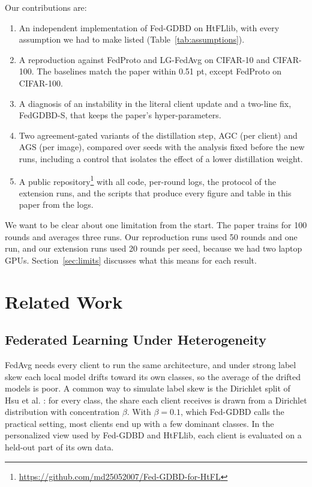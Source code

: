 \documentclass[conference]{IEEEtran}
\begin{document}
Our contributions are:
\begin{enumerate}
\item An independent implementation of Fed-GDBD on HtFLlib, with every assumption we had to make listed (Table~\ref{tab:assumptions}).
\item A reproduction against FedProto and LG-FedAvg on CIFAR-10 and CIFAR-100. The baselines match the paper within 0.51 pt, except FedProto on CIFAR-100.
\item A diagnosis of an instability in the literal client update and a two-line fix, FedGDBD-S, that keeps the paper's hyper-parameters.
\item Two agreement-gated variants of the distillation step, AGC (per client) and AGS (per image), compared over \NSeeds{} seeds with the analysis fixed before the new runs, including a control that isolates the effect of a lower distillation weight.
\item A public repository\footnote{\url{https://github.com/md25052007/Fed-GDBD-for-HtFL}} with all code, per-round logs, the protocol of the extension runs, and the scripts that produce every figure and table in this paper from the logs.
\end{enumerate}

We want to be clear about one limitation from the start. The paper trains for 100 rounds and averages three runs. Our reproduction runs used 50 rounds and one run, and our extension runs used 20 rounds per seed, because we had two laptop GPUs. Section~\ref{sec:limits} discusses what this means for each result.

\section{Related Work}
\label{sec:related}

\subsection{Federated Learning Under Heterogeneity}
FedAvg \cite{mcmahan2017fedavg} needs every client to run the same architecture, and under strong label skew each local model drifts toward its own classes, so the average of the drifted models is poor. A common way to simulate label skew is the Dirichlet split of Hsu et al. \cite{hsu2019noniid}: for every class, the share each client receives is drawn from a Dirichlet distribution with concentration $\beta$. With $\beta=0.1$, which Fed-GDBD calls the practical setting, most clients end up with a few dominant classes. In the personalized view used by Fed-GDBD and HtFLlib, each client is evaluated on a held-out part of its own data.
\end{document}
